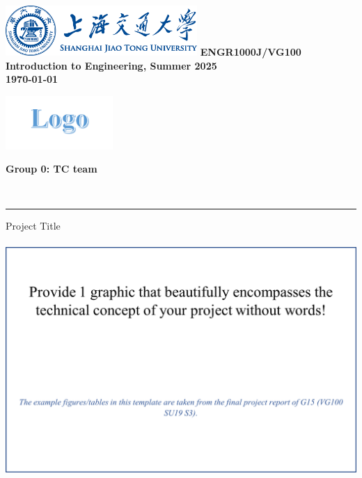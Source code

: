 \documentclass{engr1000j-s2}
\begin{document}
  \thispagestyle{firstpage}
  \includegraphics[height=0.75in]{figures/sjtubannerblue.png}
  \newline
  \newline
  \textbf{\Large ENGR1000J/VG100 Introduction to Engineering, Summer 2025}\\[0.5em]
  \textbf{{\Large \today}}

  \begin{center}
    \begin{minipage}{0.45\textwidth}
      \includegraphics[height=0.8in]{figures/team logo.png}
    \end{minipage}\hfill
    \begin{minipage}{0.45\textwidth}
      \textbf{\Large Group 0: TC team}
    \end{minipage}\\[0.2em]
  \end{center}

  \noindent
  {\color{gray!30}\rule{\textwidth}{0.1pt}}

  {\Huge Project Title}

  \begin{center}
    \includegraphics[height=3.5in]{figures/preface_picture.png}
  \end{center}
\end{document}
